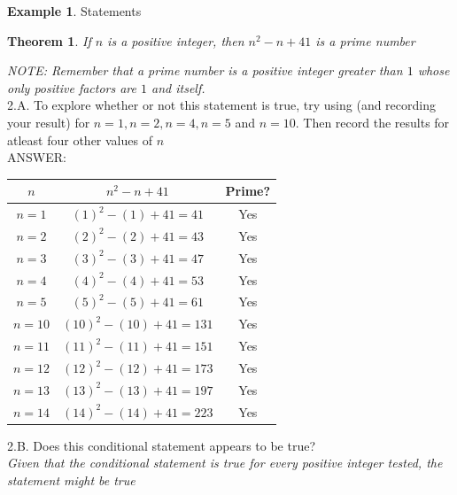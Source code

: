 \documentclass{book}
\newtheorem{theorem}{Theorem}[section]
\theoremstyle{definition}
\newtheorem{example}{Example}[definition]
\theoremstyle{remark}
\begin{document}
\begin{example}
Statements \cite[Chap.1, P.C.1.4, Q.2]{ted} \\

\begin{tcolorbox}
    \begin{theorem}
        If $n$ is a positive integer, then $n^2 - n +41$ is a prime number
    \end{theorem}
\end{tcolorbox}

{\it NOTE: Remember that a prime number is a positive integer greater than $1$ whose only positive factors are $1$ and itself.} \\

2.A. To explore whether or not this statement is true, try using (and recording your result) for $n=1, n=2, n=4, n=5$ and $n=10$. Then record the results for atleast four other values of $n$ \\

ANSWER: \\
\begin{center}
\begin{tabular}{|c|c|c|}
\hline 
$n$ & $n^2 - n +41$ & Prime? \\ 
\hline 
$n=1$ & $(1)^2-(1)+41 = 41$ & Yes \\ 
\hline 
$n=2$ & $(2)^2-(2)+41 = 43$ & Yes \\
\hline 
$n=3$ & $(3)^2-(3)+41 = 47$ & Yes \\
\hline 
$n=4$ & $(4)^2-(4)+41 = 53$ & Yes \\
\hline 
$n=5$ & $(5)^2-(5)+41 = 61$ & Yes \\
\hline 
$n=10$ & $(10)^2-(10)+41 = 131$ & Yes \\
\hline 
$n=11$ & $(11)^2-(11)+41 = 151$ & Yes \\
\hline 
$n=12$ & $(12)^2-(12)+41 = 173$ & Yes \\
\hline 
$n=13$ & $(13)^2-(13)+41 = 197$ & Yes \\
\hline 
$n=14$ & $(14)^2-(14)+41 = 223$ & Yes \\
\hline 
\end{tabular} 
\end{center}

2.B. Does this conditional statement appears to be true? \\
{\it Given that the conditional statement is true for every positive integer tested, the statement might be true} \\
\end{example}
\end{document}
